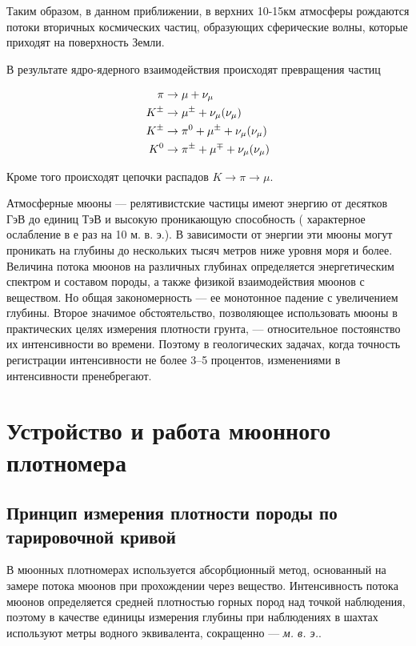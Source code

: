 Таким образом, в данном приближении, в верхних 10-15км атмосферы рождаются потоки вторичных космических частиц, образующих сферические волны, которые приходят на поверхность Земли.

В результате ядро-ядерного взаимодействия происходят превращения частиц

\begin{equation}
\begin{split}
	\pi &\to \mu + \nu_\mu \\
	K^\pm &\to \mu^\pm + \nu_\mu (\-{\nu_\mu}) \\
	K^\pm &\to \pi^0 + \mu^\pm + \nu_\mu (\-{\nu_\mu}) \\
	K^0 &\to \pi^\pm + \mu^\mp + \nu_\mu (\-{\nu_\mu}) 
\end{split}
\end{equation}

Кроме того происходят цепочки распадов $K \to \pi \to \mu$.


Атмосферные мюоны --- релятивистские частицы имеют энергию от десятков ГэВ до единиц ТэВ и высокую проникающую способность ( характерное ослабление в е раз на 10 м. в. э.). 
В зависимости от энергии эти мюоны могут проникать на глубины 
до нескольких тысяч метров ниже уровня моря и более. Величина 
потока мюонов на различных глубинах определяется 
энергетическим спектром и составом породы, 
а также физикой взаимодействия мюонов с веществом. Но общая 
закономерность --- ее монотонное падение с увеличением глубины. 
Второе значимое обстоятельство, позволяющее использовать мюоны 
в практических целях измерения плотности грунта, --- относительное 
постоянство их интенсивности во времени. Поэтому 
в геологических задачах, когда точность регистрации 
интенсивности не более 3--5 процентов,  
изменениями в интенсивности пренебрегают.

\section{Устройство и работа мюонного плотномера}\label{sect1_3}

\subsection{Принцип измерения плотности породы по тарировочной кривой}\label{subsect1_3_1}

В мюонных плотномерах используется абсорбционный метод, 
основанный на замере потока мюонов при прохождении
через вещество. Интенсивность потока мюонов определяется 
средней плотностью горных пород над точкой наблюдения, 
поэтому в качестве единицы измерения глубины 
при наблюдениях в шахтах используют метры водного эквивалента, сокращенно --- \textit{м. в. э.}. 

